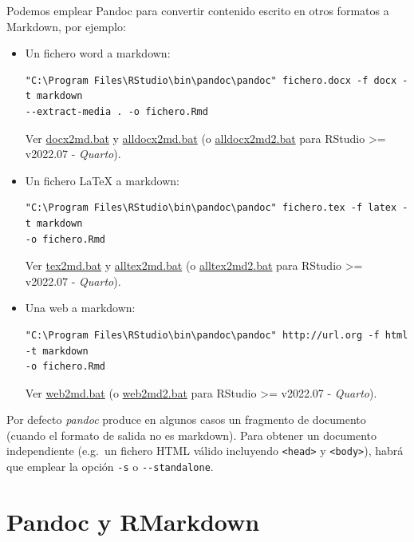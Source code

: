 \documentclass[
]{book}
\theoremstyle{break}
\theoremstyle{nonumberplain}
\begin{document}
Podemos emplear Pandoc para convertir contenido escrito en otros formatos a Markdown, por ejemplo:

\begin{itemize}
\item
  Un fichero word a markdown:

\begin{verbatim}
"C:\Program Files\RStudio\bin\pandoc\pandoc" fichero.docx -f docx -t markdown 
--extract-media . -o fichero.Rmd 
\end{verbatim}

  Ver \href{ejemplos/rmarkdown/docx2md.bat}{docx2md.bat} y \href{ejemplos/rmarkdown/alldocx2md.bat}{alldocx2md.bat} (o \href{ejemplos/rmarkdown/alldocx2md2.bat}{alldocx2md2.bat} para RStudio \textgreater= v2022.07 - \emph{Quarto}).
\item
  Un fichero LaTeX a markdown:

\begin{verbatim}
"C:\Program Files\RStudio\bin\pandoc\pandoc" fichero.tex -f latex -t markdown 
-o fichero.Rmd 
\end{verbatim}

  Ver \href{ejemplos/rmarkdown/tex2md.bat}{tex2md.bat} y \href{ejemplos/rmarkdown/alltex2md.bat}{alltex2md.bat} (o \href{ejemplos/rmarkdown/alltex2md2.bat}{alltex2md2.bat} para RStudio \textgreater= v2022.07 - \emph{Quarto}).
\item
  Una web a markdown:

\begin{verbatim}
"C:\Program Files\RStudio\bin\pandoc\pandoc" http://url.org -f html -t markdown 
-o fichero.Rmd
\end{verbatim}

  Ver \href{ejemplos/rmarkdown/web2md.bat}{web2md.bat} (o \href{ejemplos/rmarkdown/web2md2.bat}{web2md2.bat} para RStudio \textgreater= v2022.07 - \emph{Quarto}).
\end{itemize}

Por defecto \emph{pandoc} produce en algunos casos un fragmento de documento (cuando el formato de salida no es markdown).
Para obtener un documento independiente (e.g.~un fichero HTML válido incluyendo \texttt{\textless{}head\textgreater{}} y \texttt{\textless{}body\textgreater{}}), habrá que emplear la opción \texttt{-s} o \texttt{-\/-standalone}.

\hypertarget{pandoc-y-rmarkdown}{%
\section{Pandoc y RMarkdown}\label{pandoc-y-rmarkdown}}
\end{document}
